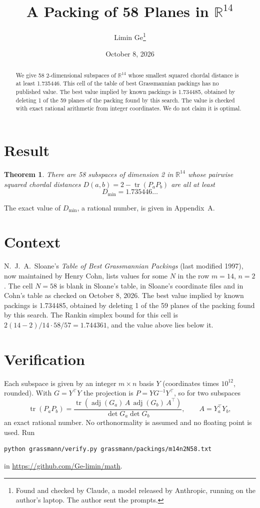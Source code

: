 \documentclass[11pt,a4paper]{article}
\title{A Packing of 58 Planes in $\mathbb{R}^{14}$}
\author{Limin Ge\thanks{Found and checked by Claude, a model released by Anthropic, running on the author's laptop. The author sent the prompts.}}
\date{October 8, 2026}
\newtheorem*{theorem}{Theorem}
\begin{document}
\maketitle
\begin{abstract}
We give 58 2-dimensional subspaces of $\mathbb{R}^{14}$ whose smallest squared chordal distance is at least 1.735446. This cell of the table of best Grassmannian packings has no published value. The best value implied by known packings is 1.734485, obtained by deleting 1 of the 59 planes of the packing found by this search. The value is checked with exact rational arithmetic from integer coordinates. We do not claim it is optimal.
\end{abstract}

\section{Result}
\begin{theorem}
There are 58 subspaces of dimension 2 in $\mathbb{R}^{14}$ whose pairwise squared chordal distances $D(a,b) = 2 - \operatorname{tr}(P_aP_b)$ are all at least
\[ D_{\min} = 1.735446\ldots \]
\end{theorem}
The exact value of $D_{\min}$, a rational number, is given in Appendix~A.


\section{Context}
N.~J.~A.~Sloane's \emph{Table of Best Grassmannian Packings} (last modified 1997), now maintained by Henry Cohn, lists values for some $N$ in the row $m=14$, $n=2$. The cell $N=58$ is blank in Sloane's table, in Sloane's coordinate files and in Cohn's table as checked on October 8, 2026. The best value implied by known packings is 1.734485, obtained by deleting 1 of the 59 planes of the packing found by this search. The Rankin simplex bound for this cell is $2(14-2)/14\cdot 58/57 = 1.744361$, and the value above lies below it.


\section{Verification}
Each subspace is given by an integer $m\times n$ basis $Y$ (coordinates times $10^{12}$, rounded). With $G=Y^\top Y$ the projection is $P=YG^{-1}Y^\top$, so for two subspaces
\[ \operatorname{tr}(P_aP_b)=\frac{\operatorname{tr}(\operatorname{adj}(G_a)\,A\,\operatorname{adj}(G_b)\,A^\top)}{\det G_a\det G_b},\qquad A=Y_a^\top Y_b, \]
an exact rational number. No orthonormality is assumed and no floating point is used. Run
\begin{verbatim}
python grassmann/verify.py grassmann/packings/m14n2N58.txt
\end{verbatim}
in \url{https://github.com/Ge-limin/math}.
\end{document}
